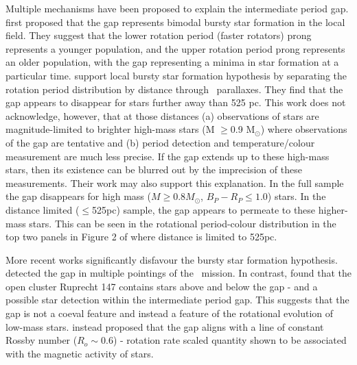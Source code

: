 Multiple mechanisms have been proposed to explain the intermediate period gap.
\citet{mcquillan_rotation_2014} first proposed that the gap represents bimodal bursty star formation in the local \kepler field.
They suggest that the lower rotation period (faster rotators) prong represents a younger population, and the upper rotation period prong represents an older population, with the gap representing a minima in star formation at a particular time.
\citet{davenport_rotating_2018} support local bursty star formation hypothesis by separating the \kepler{} rotation period distribution by distance through \gaia{} \ parallaxes.
They find that the gap appears to disappear for stars further away than 525 pc.
This work does not acknowledge, however, that at those distances (a) observations of stars are magnitude-limited to brighter high-mass stars (M $\geq$0.9 M$_{\odot}$) where observations of the gap are tentative and (b) period detection and temperature/colour measurement are much less precise.
If the gap extends up to these high-mass stars, then its existence can be blurred out by the imprecision of these measurements.
Their work may also support this explanation.
In the full \citep{mcquillan_rotation_2014} sample the gap disappears for high mass ($M \geq 0.8 M_{\odot}$, $B_P - R_P \leq 1.0$) stars.
In the distance limited ($\leq$525pc) sample, the gap appears to permeate to these higher-mass stars. 
This can be seen in the rotational period-colour distribution in the top two panels in Figure 2 of \citet{davenport_rotating_2018} where distance is limited to 525pc.

More recent works significantly disfavour the bursty star formation hypothesis.
\citet{gordon_stellar_2021} detected the gap in multiple pointings of the \ktoo \ mission. 
In contrast, \citet{curtis_when_2020} found that the open cluster Ruprecht 147 contains stars above and below the gap - and a possible star detection within the intermediate period gap.
This suggests that the gap is not a coeval feature and instead a feature of the rotational evolution of low-mass stars.
\citet{curtis_when_2020} instead proposed that the gap aligns with a line of constant Rossby number ($R_o\sim 0.6$) - rotation rate scaled quantity shown to be associated with the magnetic activity of stars.

